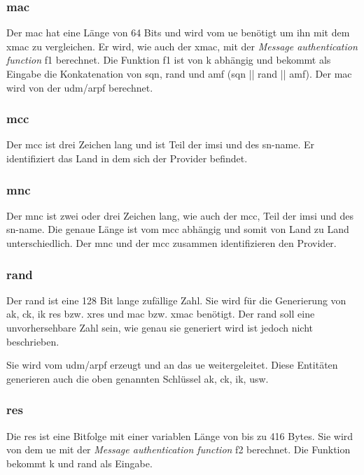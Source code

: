 \subsubsection{\gls{mac}}
Der \gls{mac} hat eine Länge von 64 Bits und wird vom \gls{ue} benötigt um ihn mit dem \gls{xmac} zu vergleichen.
Er wird, wie auch der \gls{xmac}, mit der \textit{Message authentication function} f1 berechnet. %
Die Funktion f1 ist von \gls{k} abhängig und bekommt als Eingabe die Konkatenation von \gls{sqn}, \gls{rand} und \gls{amf} (\gls{sqn} || \gls{rand} || \gls{amf}). %
Der \gls{mac} wird von der \gls{udm}/\gls{arpf} berechnet.

\subsubsection{\gls{mcc}}
Der \gls{mcc} ist drei Zeichen lang und ist Teil der \gls{imsi} und des \gls{sn-name}. %
Er identifiziert das Land in dem sich der Provider befindet. 

\subsubsection{\gls{mnc}}
Der \gls{mnc} ist zwei oder drei Zeichen lang, wie auch der \gls{mcc}, Teil der \gls{imsi} und des \gls{sn-name}. %
Die genaue Länge ist vom \gls{mcc} abhängig und somit von Land zu Land unterschiedlich.
Der \gls{mnc} und der \gls{mcc} zusammen identifizieren den Provider.


\subsubsection{\gls{rand}}
Der \gls{rand} ist eine 128 Bit lange zufällige Zahl. %
Sie wird für die Generierung von \gls{ak}, \gls{ck}, \gls{ik} \gls{res} bzw. \gls{xres} und \gls{mac} bzw. \gls{xmac} benötigt. 
Der \gls{rand} soll eine unvorhersehbare Zahl sein, wie genau sie generiert wird ist jedoch nicht beschrieben. %

Sie wird vom \gls{udm}/\gls{arpf} erzeugt und an das \gls{ue} weitergeleitet. Diese Entitäten generieren auch die oben genannten Schlüssel \gls{ak}, \gls{ck}, \gls{ik}, usw.

\subsubsection{\gls{res}}
Die \gls{res} ist eine Bitfolge mit einer variablen Länge von bis zu 416 Bytes. %
Sie wird von dem \gls{ue} mit der \textit{Message authentication function} f2 berechnet.
Die Funktion bekommt \gls{k} und \gls{rand} als Eingabe. %

